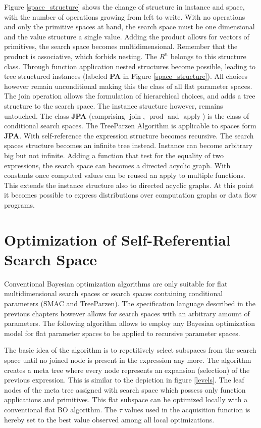 \documentclass[english]{article}
\newcommand{\join}{\operatorname{join}}
\newcommand{\apply}{\operatorname{apply}}
\newcommand{\prot}{\operatorname{prod}}
\begin{document}
Figure \ref{space_structure} shows the change of structure in instance and space, with the number of operations growing from left to write.
With no operations and only the primitive spaces at hand, the search space must be one dimensional and the value structure a single value.
Adding the product allows for vectors of primitives, the search space becomes multidimensional. Remember that the product is associative, which forbids nesting. The $R^n$ belongs to this structure class.
Through function application nested structures become possible, leading to tree structured instances (labeled \textbf{PA} in Figure \ref{space_structure}). All choices however remain unconditional making this the class of all flat parameter spaces.
The join operation allows the formulation of hierarchical choices, and adds a tree structure to the search space. The instance structure however, remains untouched.
The class \textbf{JPA} (comprising $\join$, $\prot$ and $\apply$) is the class of conditional search spaces. The TreeParzen Algorithm is applicable to spaces form \textbf{JPA}.
With self-reference the expression structure becomes recursive. The search spaces structure becomes an infinite tree instead. Instance can become arbitrary big but not infinite.
Adding a function that test for the equality of two expressions, the search space can becomes a directed acyclic graph.
With constants once computed values can be reused an apply to multiple functions. This extends the instance structure also to directed acyclic graphs. At this point it becomes possible to express distributions over computation graphs or data flow programs.




\section{Optimization of Self-Referential Search Space}
Conventional Bayesian optimization algorithms are only suitable for flat multidimensional search spaces or search spaces containing conditional parameters (SMAC and TreeParzen). The specification language described in the previous chapters however allows for search spaces with an arbitrary amount of parameters. The following algorithm allows to employ any Bayesian optimization model for flat parameter spaces to be applied to recursive parameter spaces.

The basic idea of the algorithm is to repetitively select subspaces from the search space until no joined node is present in the expression any more. The algorithm creates a meta tree where every node represents an expansion (selection) of the previous expression. This is similar to the depiction in figure \ref{levels}. The leaf nodes of the meta tree assigned with search space which possess only function applications and primitives. This flat subspace can be optimized locally with a conventional flat BO algorithm. The $\tau$ values used in the acquisition function is hereby set to the best value observed among all local optimizations.
\end{document}
